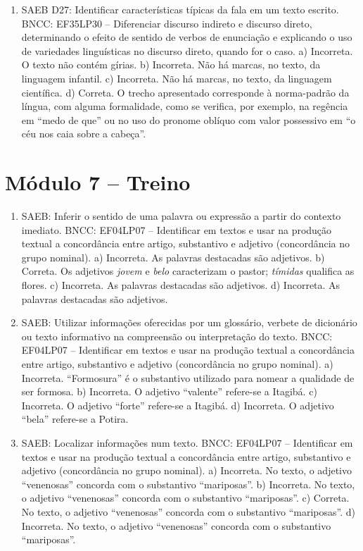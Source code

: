 \begin{enumerate}
\item
SAEB D27: Identificar características típicas da fala em um texto
escrito.
BNCC: EF35LP30 -- Diferenciar discurso indireto e discurso direto,
determinando o efeito de sentido de verbos de enunciação e explicando o
uso de variedades linguísticas no discurso direto, quando for o caso.
a)  Incorreta. O texto não contém gírias.
b)  Incorreta. Não há marcas, no texto, da linguagem infantil.
c)  Incorreta. Não há marcas, no texto, da linguagem científica.
d)  Correta. O trecho apresentado corresponde à norma-padrão da língua, 
com alguma formalidade, como se verifica, por exemplo, na regência em
``medo de que'' ou no uso do pronome oblíquo com valor possessivo em 
``o céu nos caia sobre a cabeça''.
\end{enumerate}

\section*{Módulo 7 – Treino}

\begin{enumerate}
\item
SAEB: Inferir o sentido de uma palavra ou expressão a partir do
contexto imediato.
BNCC: EF04LP07 -- Identificar em textos e usar na produção textual a
concordância entre artigo, substantivo e adjetivo (concordância no grupo
nominal).
a)  Incorreta. As palavras destacadas são adjetivos.
b)  Correta. Os adjetivos \textit{jovem} e \textit{belo} caracterizam o
pastor; \textit{tímidas} qualifica as flores.
c)  Incorreta. As palavras destacadas são adjetivos.
d)  Incorreta. As palavras destacadas são adjetivos.

\item
SAEB: Utilizar informações oferecidas por um glossário, verbete de
dicionário ou texto informativo na compreensão ou interpretação do
texto.
BNCC: EF04LP07 -- Identificar em textos e usar na produção textual a
concordância entre artigo, substantivo e adjetivo (concordância no grupo
nominal).
a) Incorreta. ``Formosura'' é o substantivo utilizado para nomear a qualidade
de ser formosa.
b) Incorreta. O adjetivo ``valente'' refere-se a Itagibá.
c)  Incorreta. O adjetivo ``forte'' refere-se a Itagibá.
d)  Incorreta. O adjetivo ``bela'' refere-se a Potira.

\item
SAEB: Localizar informações num texto.
BNCC: EF04LP07 -- Identificar em textos e usar na produção textual a
concordância entre artigo, substantivo e adjetivo (concordância no grupo
nominal).
a) Incorreta. No texto, o adjetivo ``venenosas'' concorda com o substantivo ``mariposas''.
b) Incorreta. No texto, o adjetivo ``venenosas'' concorda com o substantivo ``mariposas''.
c) Correta. No texto, o adjetivo ``venenosas'' concorda com o substantivo ``mariposas''.
d) Incorreta. No texto, o adjetivo ``venenosas'' concorda com o substantivo ``mariposas''.
\end{enumerate}


